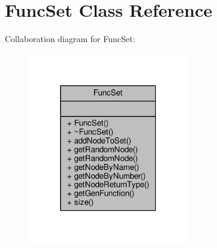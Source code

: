 \hypertarget{classFuncSet}{}\section{Func\+Set Class Reference}
\label{classFuncSet}


Collaboration diagram for Func\+Set\+:
\nopagebreak
\begin{figure}[H]
\begin{center}
\leavevmode
\includegraphics[width=199pt]{classFuncSet__coll__graph}
\end{center}
\end{figure}
